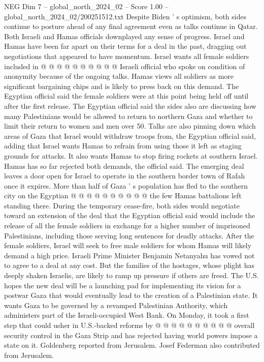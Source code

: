 \begin{textsample}{NEG Dim 7 – global\_north\_2024\_02 – Score 1.00 – global\_north\_2024\_02/200251512.txt}
Despite Biden ' s optimism, both sides continue to posture ahead of any final agreement even as talks continue in Qatar.
Both Israeli and Hamas officials downplayed any sense of progress.
Israel and Hamas have been far apart on their terms for a deal in the past, dragging out negotiations that appeared to have momentum.
Israel wants all female soldiers included in @ @ @ @ @ @ @ @ @ @ Israeli official who spoke on condition of anonymity because of the ongoing talks.
Hamas views all soldiers as more significant bargaining chips and is likely to press back on this demand.
The Egyptian official said the female soldiers were at this point being held off until after the first release.
The Egyptian official said the sides also are discussing how many Palestinians would be allowed to return to northern Gaza and whether to limit their return to women and men over 50.
Talks are also pinning down which areas of Gaza that Israel would withdraw troops from, the Egyptian official said, adding that Israel wants Hamas to refrain from using those it left as staging grounds for attacks.
It also wants Hamas to stop firing rockets at southern Israel.
Hamas has so far rejected both demands, the official said.
The emerging deal leaves a door open for Israel to operate in the southern border town of Rafah once it expires.
More than half of Gaza ' s population has fled to the southern city on the Egyptian @ @ @ @ @ @ @ @ @ @ the few Hamas battalions left standing there.
During the temporary cease-fire, both sides would negotiate toward an extension of the deal that the Egyptian official said would include the release of all the female soldiers in exchange for a higher number of imprisoned Palestinians, including those serving long sentences for deadly attacks.
After the female soldiers, Israel will seek to free male soldiers for whom Hamas will likely demand a high price.
Israeli Prime Minister Benjamin Netanyahu has vowed not to agree to a deal at any cost.
But the families of the hostages, whose plight has deeply shaken Israelis, are likely to ramp up pressure if others are freed.
The U.S. hopes the new deal will be a launching pad for implementing its vision for a postwar Gaza that would eventually lead to the creation of a Palestinian state.
It wants Gaza to be governed by a revamped Palestinian Authority, which administers part of the Israeli-occupied West Bank.
On Monday, it took a first step that could usher in U.S.-backed reforms by @ @ @ @ @ @ @ @ @ @ overall security control in the Gaza Strip and has rejected having world powers impose a state on it.
Goldenberg reported from Jerusalem.
Josef Federman also contributed from Jerusalem.

\end{textsample}
